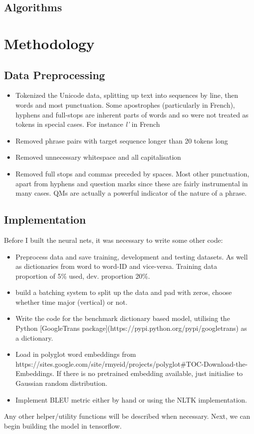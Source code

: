 \documentclass[]{article}
\begin{document}
\subsection{Algorithms}
\section{Methodology}
\subsection{Data Preprocessing}
\begin{itemize}
	\item Tokenized the Unicode data, splitting up text into sequences by line, then words and most punctuation. Some apostrophes (particularly in French), hyphens and full-stops are inherent parts of words and so were not treated as tokens in special cases. For instance \textit{l'} in French
	\item Removed phrase pairs with target sequence longer than 20 tokens long
	\item Removed unnecessary whitespace and all capitalisation
	\item Removed full stops and commas preceded by spaces. Most other punctuation, apart from hyphens and question marks since these are fairly instrumental in many cases. QMs are actually a powerful indicator of the nature of a phrase.
	
\end{itemize}



\subsection{Implementation}
Before I built the neural nets, it was necessary to write some other code:
\begin{itemize}
	\item Preprocess data and save training, development and testing datasets. As well as dictionaries from word to word-ID and vice-versa. Training data proportion of 5\% used, dev. proportion 20\%.
	\item build a batching system to split up the data and pad with zeros, choose whether time major (vertical) or not.
	\item Write the code for the benchmark dictionary based model, utilising the Python [GoogleTrans package](https://pypi.python.org/pypi/googletrans) as a dictionary.
	\item Load in polyglot word embeddings from https://sites.google.com/site/rmyeid/projects/polyglot\#TOC-Download-the-Embeddings. If there is no pretrained embedding available, just initialise to Gaussian random distribution. 
	\item Implement BLEU metric either by hand or using the NLTK implementation.
\end{itemize}
Any other helper/utility functions will be described when necessary. Next, we can begin building the model in tensorflow.
\end{document}
